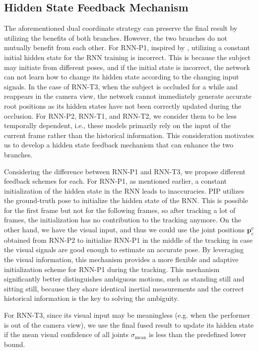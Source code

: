\documentclass[sigconf,nonacm=true]{acmart}
\begin{document}
\subsection{Hidden State Feedback Mechanism}\label{sec:feedback}
The aforementioned dual coordinate strategy can preserve the final result by utilizing the benefits of both branches.
However, the two branches do not mutually benefit from each other.
For RNN-P1, inspired by \cite{PIP},  utilizing a constant initial hidden state for the RNN training is incorrect.
This is because the subject may initiate from different poses, and if the initial state is incorrect, the network can not learn how to change its hidden state according to the changing input signals.
In the case of RNN-T3, when the subject is occluded for a while and reappears in the camera view, the network cannot immediately generate accurate root positions as its hidden states have not been correctly updated during the occlusion.
For RNN-P2, RNN-T1, and RNN-T2, we consider them to be less temporally dependent, i.e., these models primarily rely on the input of the current frame rather than the historical information.
This consideration motivates us to develop a hidden state feedback mechanism that can enhance the two branches.
\par
Considering the difference between RNN-P1 and RNN-T3, we propose different feedback schemes for each.
For RNN-P1, as mentioned earlier, a constant initialization of the hidden state in the RNN leads to inaccuracies.
PIP utilizes the ground-truth pose to initialize the hidden state of the RNN.
This is possible for the first frame but not for the following frames, so after tracking a lot of frames, the initialization has no contribution to the tracking anymore.
On the other hand, we have the visual input, and thus we could use the joint positions $\boldsymbol{p}_{\mathrm{c}}^{\mathrm{e}}$ obtained from RNN-P2 to initialize RNN-P1 in the middle of the tracking in case the visual signals are good enough to estimate an accurate pose.
By leveraging the visual information, this mechanism provides a more flexible and adaptive initialization scheme for RNN-P1 during the tracking.
This mechanism significantly better distinguishes ambiguous motions, such as standing still and sitting still, because they share identical inertial measurements and the correct historical information is the key to solving the ambiguity.
\par
For RNN-T3, since its visual input may be meaningless (e.g. when the performer is out of the camera view), we use the final fused result to update its hidden state if the mean visual confidence of all joints $\sigma_\mathrm{mean}$ is less than the predefined lower bound.
\end{document}

